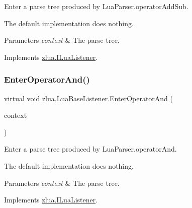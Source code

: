 Enter a parse tree produced by Lua\+Parser.\+operator\+Add\+Sub. 

The default implementation does nothing.


\begin{DoxyParams}{Parameters}
{\em context} & The parse tree.\\
\hline
\end{DoxyParams}


Implements \mbox{\hyperlink{interfacezlua_1_1_i_lua_listener_a145cf8b9fa700148a09b9d68624640f8}{zlua.\+I\+Lua\+Listener}}.

\mbox{\label{classzlua_1_1_lua_base_listener_a78b389b5400066d8a9171b86b1529cf7}} 
\subsubsection{\texorpdfstring{Enter\+Operator\+And()}{EnterOperatorAnd()}}
{\footnotesize\ttfamily virtual void zlua.\+Lua\+Base\+Listener.\+Enter\+Operator\+And (\begin{DoxyParamCaption}\item[{\mbox{[}\+Not\+Null\mbox{]} \mbox{\hyperlink{classzlua_1_1_lua_parser_1_1_operator_and_context}{Lua\+Parser.\+Operator\+And\+Context}}}]{context }\end{DoxyParamCaption})\hspace{0.3cm}{\ttfamily [virtual]}}



Enter a parse tree produced by Lua\+Parser.\+operator\+And. 

The default implementation does nothing.


\begin{DoxyParams}{Parameters}
{\em context} & The parse tree.\\
\hline
\end{DoxyParams}


Implements \mbox{\hyperlink{interfacezlua_1_1_i_lua_listener_aa0c0270aabb19cc89bce3c5823a2f012}{zlua.\+I\+Lua\+Listener}}.

\mbox{\label{classzlua_1_1_lua_base_listener_af4009c58d1272593e9d8a18b8e306591}} 
